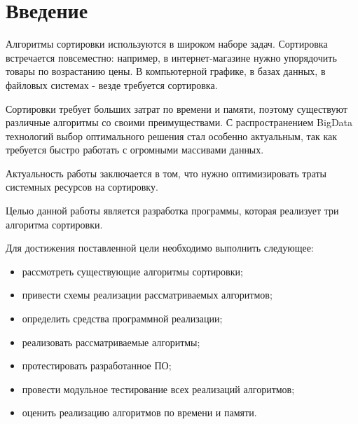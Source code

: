 \newpage
{}

\chapter*{Введение}
Алгоритмы сортировки используются в широком наборе задач.
Сортировка встречается повсеместно: например, в интернет-магазине нужно упорядочить товары по возрастанию цены.
В компьютерной графике, в базах данных, в файловых системах - везде требуется сортировка.

Сортировки требует больших затрат по времени и памяти, поэтому существуют различные алгоритмы со своими преимуществами.
С распространением BigData технологий выбор оптимального решения стал особенно актуальным, так как требуется быстро
работать с огромными массивами данных.

Актуальность работы заключается в том, что нужно оптимизировать траты системных ресурсов на сортировку.

Целью данной работы является разработка программы, которая реализует три алгоритма сортировки.

Для достижения поставленной цели необходимо выполнить следующее:
\begin{itemize}
	\item рассмотреть существующие алгоритмы сортировки;
	\item привести схемы реализации рассматриваемых алгоритмов;
	\item определить средства программной реализации;
	\item реализовать рассматриваемые алгоритмы;
	\item протестировать разработанное ПО;
	\item провести модульное тестирование всех реализаций алгоритмов;
	\item оценить реализацию алгоритмов по времени и памяти.
\end{itemize}